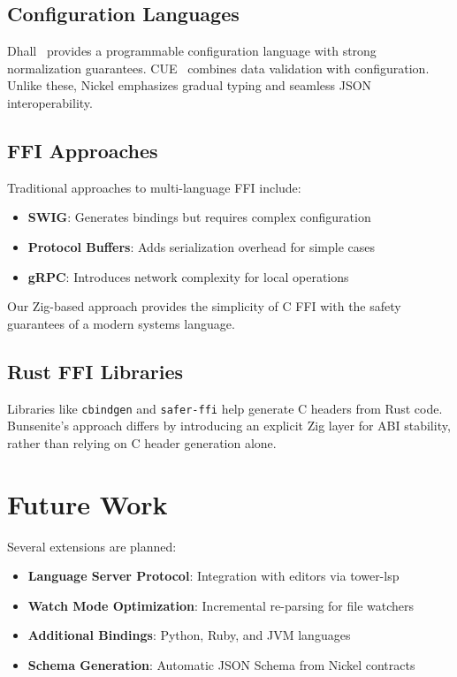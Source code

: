 \documentclass[11pt,a4paper]{article}
\begin{document}
\subsection{Configuration Languages}

Dhall~\cite{dhall} provides a programmable configuration language with strong normalization guarantees. CUE~\cite{cue} combines data validation with configuration. Unlike these, Nickel emphasizes gradual typing and seamless JSON interoperability.

\subsection{FFI Approaches}

Traditional approaches to multi-language FFI include:

\begin{itemize}
    \item \textbf{SWIG}: Generates bindings but requires complex configuration
    \item \textbf{Protocol Buffers}: Adds serialization overhead for simple cases
    \item \textbf{gRPC}: Introduces network complexity for local operations
\end{itemize}

Our Zig-based approach provides the simplicity of C FFI with the safety guarantees of a modern systems language.

\subsection{Rust FFI Libraries}

Libraries like \texttt{cbindgen} and \texttt{safer-ffi} help generate C headers from Rust code. Bunsenite's approach differs by introducing an explicit Zig layer for ABI stability, rather than relying on C header generation alone.

\section{Future Work}

Several extensions are planned:

\begin{itemize}
    \item \textbf{Language Server Protocol}: Integration with editors via tower-lsp
    \item \textbf{Watch Mode Optimization}: Incremental re-parsing for file watchers
    \item \textbf{Additional Bindings}: Python, Ruby, and JVM languages
    \item \textbf{Schema Generation}: Automatic JSON Schema from Nickel contracts
\end{itemize}
\end{document}

